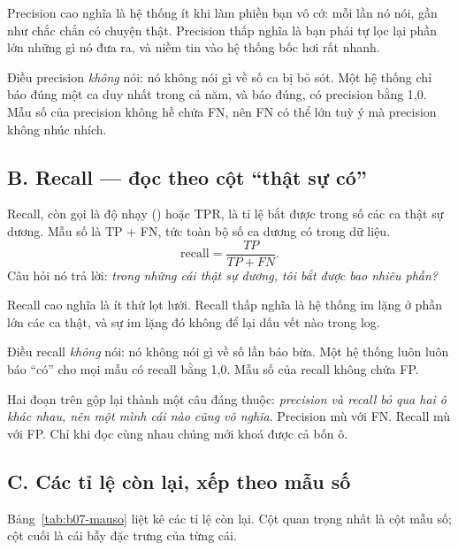 \documentclass[../../deep_learning.tex]{subfiles}
\begin{document}
Precision cao nghĩa là hệ thống ít khi làm phiền bạn vô cớ: mỗi lần nó nói, gần như chắc chắn có chuyện thật. Precision thấp nghĩa là bạn phải tự lọc lại phần lớn những gì nó đưa ra, và niềm tin vào hệ thống bốc hơi rất nhanh.

Điều precision \emph{không} nói: nó không nói gì về số ca bị bỏ sót. Một hệ thống chỉ báo đúng một ca duy nhất trong cả năm, và báo đúng, có precision bằng 1{,}0. Mẫu số của precision không hề chứa FN, nên FN có thể lớn tuỳ ý mà precision không nhúc nhích.

\subsection{B. Recall --- đọc theo cột ``thật sự có''}
Recall, còn gọi là độ nhạy () hoặc TPR, là tỉ lệ bắt được trong số các ca thật sự dương. Mẫu số là TP + FN, tức toàn bộ số ca dương có trong dữ liệu.
\[
\text{recall} = \frac{TP}{TP+FN}.
\]
Câu hỏi nó trả lời: \emph{trong những cái thật sự dương, tôi bắt được bao nhiêu phần?}

Recall cao nghĩa là ít thứ lọt lưới. Recall thấp nghĩa là hệ thống im lặng ở phần lớn các ca thật, và sự im lặng đó không để lại dấu vết nào trong log.

Điều recall \emph{không} nói: nó không nói gì về số lần báo bừa. Một hệ thống luôn luôn báo ``có'' cho mọi mẫu có recall bằng 1{,}0. Mẫu số của recall không chứa FP.

Hai đoạn trên gộp lại thành một câu đáng thuộc: \emph{precision và recall bỏ qua hai ô khác nhau, nên một mình cái nào cũng vô nghĩa}. Precision mù với FN. Recall mù với FP. Chỉ khi đọc cùng nhau chúng mới khoá được cả bốn ô.

\subsection{C. Các tỉ lệ còn lại, xếp theo mẫu số}
Bảng~\ref{tab:b07-mauso} liệt kê các tỉ lệ còn lại. Cột quan trọng nhất là cột mẫu số; cột cuối là cái bẫy đặc trưng của từng cái.
\end{document}
